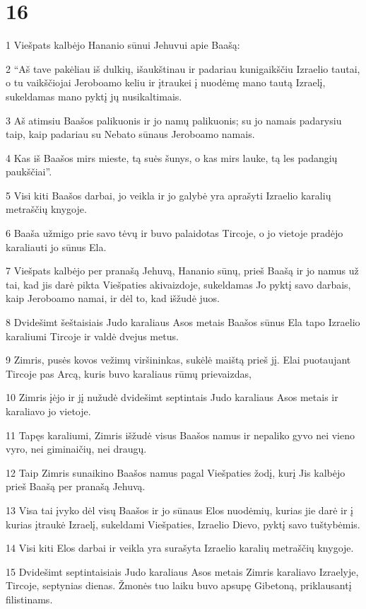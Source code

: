 \chapter{16}


\par 1 Viešpats kalbėjo Hananio sūnui Jehuvui apie Baašą: 
\par 2 “Aš tave pakėliau iš dulkių, išaukštinau ir padariau kunigaikščiu Izraelio tautai, o tu vaikščiojai Jeroboamo keliu ir įtraukei į nuodėmę mano tautą Izraelį, sukeldamas mano pyktį jų nusikaltimais. 
\par 3 Aš atimsiu Baašos palikuonis ir jo namų palikuonis; su jo namais padarysiu taip, kaip padariau su Nebato sūnaus Jeroboamo namais. 
\par 4 Kas iš Baašos mirs mieste, tą suės šunys, o kas mirs lauke, tą les padangių paukščiai”. 
\par 5 Visi kiti Baašos darbai, jo veikla ir jo galybė yra aprašyti Izraelio karalių metraščių knygoje. 
\par 6 Baaša užmigo prie savo tėvų ir buvo palaidotas Tircoje, o jo vietoje pradėjo karaliauti jo sūnus Ela. 
\par 7 Viešpats kalbėjo per pranašą Jehuvą, Hananio sūnų, prieš Baašą ir jo namus už tai, kad jis darė pikta Viešpaties akivaizdoje, sukeldamas Jo pyktį savo darbais, kaip Jeroboamo namai, ir dėl to, kad išžudė juos. 
\par 8 Dvidešimt šeštaisiais Judo karaliaus Asos metais Baašos sūnus Ela tapo Izraelio karaliumi Tircoje ir valdė dvejus metus. 
\par 9 Zimris, pusės kovos vežimų viršininkas, sukėlė maištą prieš jį. Elai puotaujant Tircoje pas Arcą, kuris buvo karaliaus rūmų prievaizdas, 
\par 10 Zimris įėjo ir jį nužudė dvidešimt septintais Judo karaliaus Asos metais ir karaliavo jo vietoje. 
\par 11 Tapęs karaliumi, Zimris išžudė visus Baašos namus ir nepaliko gyvo nei vieno vyro, nei giminaičių, nei draugų. 
\par 12 Taip Zimris sunaikino Baašos namus pagal Viešpaties žodį, kurį Jis kalbėjo prieš Baašą per pranašą Jehuvą. 
\par 13 Visa tai įvyko dėl visų Baašos ir jo sūnaus Elos nuodėmių, kurias jie darė ir į kurias įtraukė Izraelį, sukeldami Viešpaties, Izraelio Dievo, pyktį savo tuštybėmis. 
\par 14 Visi kiti Elos darbai ir veikla yra surašyta Izraelio karalių metraščių knygoje. 
\par 15 Dvidešimt septintaisiais Judo karaliaus Asos metais Zimris karaliavo Izraelyje, Tircoje, septynias dienas. Žmonės tuo laiku buvo apsupę Gibetoną, priklausantį filistinams. 

